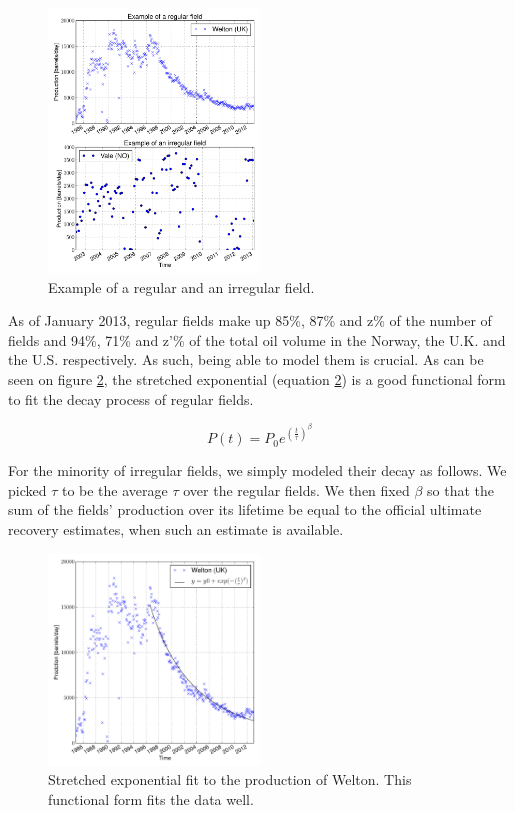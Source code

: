 \documentclass[twoside]{article}
\begin{document}
\begin{multicols}{2}
\begin{figure}[H]
    \includegraphics[width=0.5\textwidth]{regular_and_irregular.pdf}
    \caption{Example of a regular and an irregular field.}
    \label{regular_and_irregular}
\end{figure}

\noindent As of January 2013, regular fields make up 85\%, 87\% and z\% of the number of fields and 94\%, 71\% and z'\% of the total oil volume in the Norway, the U.K. and the U.S. respectively. As such, being able to model them is crucial. As can be seen on figure \ref{stretched_exponential}, the stretched exponential (equation \ref{stretched_exponential}) is a good functional form to fit the decay process of regular fields.

\begin{equation} \label{stretched_exponential}
P(t) = P_0 e^{\left (\frac{t}{\tau} \right)^\beta}
\end{equation}

For the minority of irregular fields, we simply modeled their decay as follows. We picked $\tau$ to be the average $\tau$ over the regular fields. We then fixed $\beta$ so that the sum of the fields' production over its lifetime be equal to the official ultimate recovery estimates, when such an estimate is available. %

\begin{figure}[H]
    \includegraphics[width=0.5\textwidth]{stretched_exponential.pdf}
    \caption{Stretched exponential fit to the production of Welton. This functional form fits the data well.}
    \label{stretched_exponential}
\end{figure}


\end{multicols}
\end{document}
